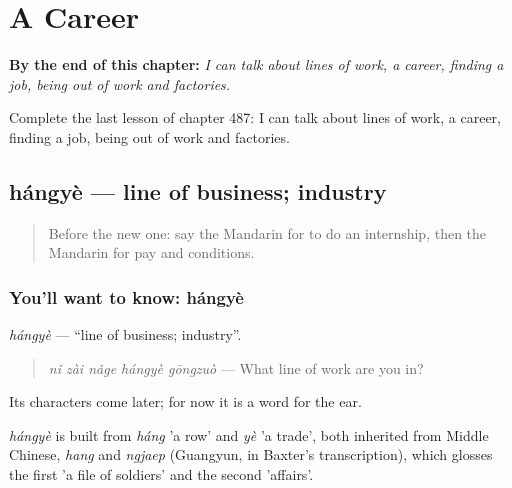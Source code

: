 
\chapter{A Career}
\label{ch:zh-a-career}

\begin{chapteropening}
\textbf{By the end of this chapter:} \emph{I can talk about lines of work, a career, finding a job, being out of work and factories.}

Complete the last lesson of chapter 487: I can talk about lines of work, a career, finding a job, being out of work and factories.
\end{chapteropening}

\section[hángyè]{hángyè — line of business; industry}

\label{lesson:ZH-C487-hangye}



\begin{quote}
Before the new one: say the Mandarin for to do an internship, then the Mandarin for pay and conditions.
\end{quote}

\subsection*{You'll want to know: hángyè}
\emph{hángyè} — \textquotedblleft{}line of business; industry\textquotedblright{}.

\begin{quote}
\emph{nǐ zài nǎge hángyè gōngzuò} — What line of work are you in?
\end{quote}

Its characters come later; for now it is a word for the ear.

\begin{cousinweb}
\emph{hángyè} is built from \emph{háng} 'a row' and \emph{yè} 'a trade', both inherited from Middle Chinese, \emph{hang} and \emph{ngjaep} (Guangyun, in Baxter's transcription), which glosses the first 'a file of soldiers' and the second 'affairs'.
\end{cousinweb}


